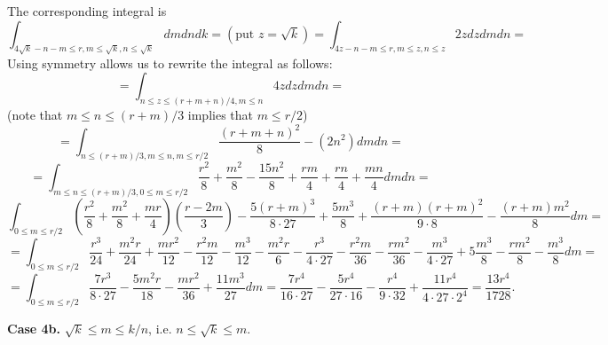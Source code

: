 \documentclass[11pt]{article}
\theoremstyle{Mystyle}
\begin{document}
The corresponding integral is
$$\int_{4\sqrt{k} - n - m \leq r, m\leq\sqrt{k}, n\leq\sqrt{k}} dm dn dk = (\mbox{put } z=\sqrt{k}) =\int_{4z - n - m\leq r, m\leq z, n\leq z} 2z dz dm dn = $$
Using symmetry allows us to rewrite the integral as follows:
$$
=\int_{n\leq z\leq (r+m+n)/4, m\leq n}4z dz dm dn=
$$
(note that $m\leq n\leq (r+m)/3$ implies that $m\leq r/2$)
$$=\int_{n\leq (r+m)/3, m\leq n, m\leq r/2} \frac{(r+m+n)^2}{8} - (2n^2) dm dn =$$
$$=\int_{m\leq n\leq (r+m)/3, 0\leq m\leq r/2} \frac{r^2}{8} + \frac{m^2}{8} - \frac{15n^2}{8} + \frac{rm}{4} + \frac{rn}{4} + \frac{mn}{4} dm dn =$$
$$\int_{0\leq m\leq r/2} \left(\frac{r^2}{8} + \frac{m^2}{8} + \frac{mr}{4}\right)\left(\frac{r-2m}{3}\right) 
-\frac{5(r+m)^3}{8\cdot 27} + \frac{5m^3}{8} + \frac{(r+m)(r+m)^2}{9\cdot 8} - \frac{(r+m)m^2}{8} dm=$$
$$=\int_{0\leq m\leq r/2}\frac{r^3}{24} + \frac{m^2r}{24} + \frac{mr^2}{12} - \frac{r^2m}{12} - \frac{m^3}{12} - \frac{m^2r}{6} - \frac{r^3}{4\cdot 27} - \frac{r^2m}{36} -
\frac{rm^2}{36} - \frac{m^3}{4\cdot 27} + 5\frac{m^3}{8} - \frac{rm^2}{8} - \frac{m^3}{8} dm=$$
\begin{equation}
\label{int2}
= \int_{0\leq m\leq r/2} \frac{7r^3}{8\cdot 27} - \frac{5m^2r}{18} - \frac{mr^2}{36} + \frac{11m^3}{27} dm = \frac{7r^4}{16\cdot 27} - \frac{5r^4}{27\cdot 16} - \frac{r^4}{9\cdot 32} + \frac{11r^4}{4\cdot 27\cdot 2^4} = \frac{13r^4}{1728}.
\end{equation}

\textbf{Case 4b.} $\sqrt{k}\leq m\leq k/n$, i.e. $n\leq \sqrt{k}\leq m$.
\end{document}
